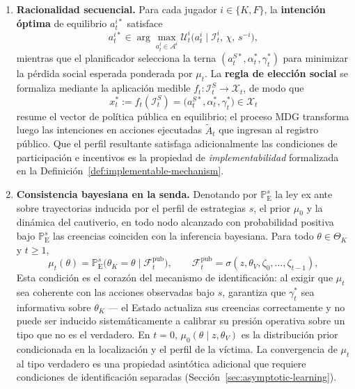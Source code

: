 \documentclass[12pt]{article}
\theoremstyle{definition}
\theoremstyle{remark}
\newcommand{\ProbE}{\mathbb{P}_{\mathrm{E}}}
\newcommand{\1}{\mathbf{1}}
\begin{document}
\begin{enumerate}
    \item \textbf{Racionalidad secuencial.} Para cada jugador $i \in \{K, F\}$, la \textbf{intención óptima} de equilibrio $a_t^{i\ast}$ satisface
    \[
    a_t^{i\ast} \in \arg\max_{a_t^i \in \mathcal{A}^i} \mathcal{U}_t^{i} \bigl( a_t^i \mid \mathcal{I}_t^i,\, \chi,\, s^{-i} \bigr),
    \]
    mientras que el planificador selecciona la terna $(a_t^{S\ast}, \alpha_t^\ast, \gamma_t^\ast)$ para minimizar la pérdida social esperada ponderada por $\mu_t$. La \textbf{regla de elección social} se formaliza mediante la aplicación medible $f_t \colon \mathcal{I}_t^S \to \mathcal{X}_t$, de modo que
    \[
    x_t^\ast := f_t(\mathcal{I}_t^S) = \bigl(a_t^{S\ast},\alpha_t^\ast,\gamma_t^\ast\bigr) \in \mathcal{X}_t
    \]
    resume el vector de política pública en equilibrio; el proceso MDG transforma luego las intenciones en acciones ejecutadas $\tilde{A}_t$ que ingresan al registro público. Que el perfil resultante satisfaga adicionalmente las condiciones de participación e incentivos es la propiedad de \emph{implementabilidad} formalizada en la Definición~\ref{def:implementable-mechanism}.

    \item \textbf{Consistencia bayesiana en la senda.} Denotando por $\ProbE^s$ la ley ex ante sobre trayectorias inducida por el perfil de estrategias $s$, el prior $\mu_0$ y la dinámica del cautiverio, en todo nodo alcanzado con probabilidad positiva bajo $\ProbE^s$ las creencias coinciden con la inferencia bayesiana. Para todo $\theta \in \Theta_K$ y $t \geq 1$,
    \[
    \mu_t(\theta) = \ProbE^s \bigl( \theta_K = \theta \mid \mathcal{F}_t^{\mathrm{pub}} \bigr), \qquad \mathcal{F}_t^{\mathrm{pub}} = \sigma(z,\theta_V,\zeta_0, \dots, \zeta_{t-1}),
    \] Esta condición es el corazón del mecanismo de identificación: al exigir que $\mu_t$ sea coherente con las acciones observadas bajo $s$, garantiza que $\gamma_t^\ast$ sea informativa sobre $\theta_K$ --- el Estado actualiza sus creencias correctamente y no puede ser inducido sistemáticamente a calibrar su presión operativa sobre un tipo que no es el verdadero. En $t=0$, $\mu_0(\theta \mid z, \theta_V)$ es la distribución prior condicionada en la localización y el perfil de la víctima. La convergencia de $\mu_t$ al tipo verdadero es una propiedad asintótica adicional que requiere condiciones de identificación separadas \textup{(}Sección~\ref{sec:asymptotic-learning}\textup{)}.
\end{enumerate}
\end{document}
